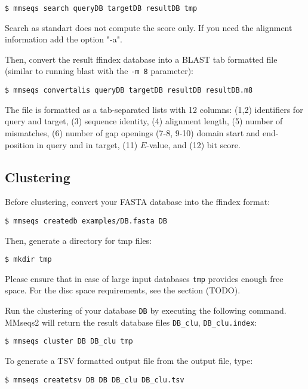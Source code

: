 \documentclass[11pt,a4paper]{scrreprt}
\begin{document}
\begin{verbatim}
$ mmseqs search queryDB targetDB resultDB tmp
\end{verbatim}
Search as standart does not compute the score only. If you need the alignment information add the option "-a". 


Then, convert the result ffindex database into a BLAST tab formatted file (similar to running blast with the \texttt{-m 8} parameter):


\begin{verbatim}
$ mmseqs convertalis queryDB targetDB resultDB resultDB.m8
\end{verbatim}


The file is formatted as a tab-separated lists with 12 columns: (1,2) identifiers for query and target, (3) sequence identity, (4) alignment length, (5) number of mismatches, (6) number of gap openings (7-8, 9-10) domain start and end-position in query and in target, (11) $E$-value, and (12) bit score.
\subsection*{Clustering}
Before clustering, convert your FASTA database into the ffindex format:


\begin{verbatim}
$ mmseqs createdb examples/DB.fasta DB
\end{verbatim}


Then, generate a directory for tmp files:


\begin{verbatim}
$ mkdir tmp
\end{verbatim}


Please ensure that in case of large input databases \texttt{tmp} provides enough free space. For the disc space requirements, see the section (TODO).


Run the clustering of your database \texttt{DB} by executing the following command. MMseqs2 will return the result database files \texttt{DB\_clu}, \texttt{DB\_clu.index}:


\begin{verbatim}
$ mmseqs cluster DB DB_clu tmp
\end{verbatim}


To generate a TSV formatted output file from the output file, type:
\begin{verbatim}
$ mmseqs createtsv DB DB DB_clu DB_clu.tsv
\end{verbatim}
\end{document}
